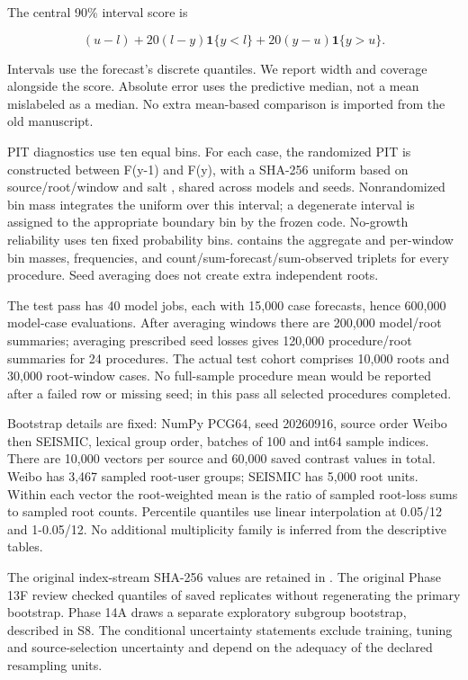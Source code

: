 The central 90\% interval score is

\[
(u-l)+20(l-y)\mathbf1\{y<l\}+20(y-u)\mathbf1\{y>u\}.
\]

Intervals use the forecast's discrete quantiles. We report width and coverage alongside the score. Absolute error uses the predictive median, not a mean mislabeled as a median. No extra mean-based comparison is imported from the old manuscript.

PIT diagnostics use ten equal bins. For each case, the randomized PIT is constructed between F(y-1) and F(y), with a SHA-256 uniform based on source/root/window and salt , shared across models and seeds. Nonrandomized bin mass integrates the uniform over this interval; a degenerate interval is assigned to the appropriate boundary bin by the frozen code. No-growth reliability uses ten fixed probability bins.  contains the aggregate and per-window bin masses, frequencies, and count/sum-forecast/sum-observed triplets for every procedure. Seed averaging does not create extra independent roots.

The test pass has 40 model jobs, each with 15,000 case forecasts, hence 600,000 model-case evaluations. After averaging windows there are 200,000 model/root summaries; averaging prescribed seed losses gives 120,000 procedure/root summaries for 24 procedures. The actual test cohort comprises 10,000 roots and 30,000 root-window cases. No full-sample procedure mean would be reported after a failed row or missing seed; in this pass all selected procedures completed.

Bootstrap details are fixed: NumPy PCG64, seed 20260916, source order Weibo then SEISMIC, lexical group order, batches of 100 and int64 sample indices. There are 10,000 vectors per source and 60,000 saved contrast values in total. Weibo has 3,467 sampled root-user groups; SEISMIC has 5,000 root units. Within each vector the root-weighted mean is the ratio of sampled root-loss sums to sampled root counts. Percentile quantiles use linear interpolation at 0.05/12 and 1-0.05/12. No additional multiplicity family is inferred from the descriptive tables.

The original index-stream SHA-256 values are retained in . The original Phase 13F review checked quantiles of saved replicates without regenerating the primary bootstrap. Phase 14A draws a separate exploratory subgroup bootstrap, described in S8. The conditional uncertainty statements exclude training, tuning and source-selection uncertainty and depend on the adequacy of the declared resampling units.

